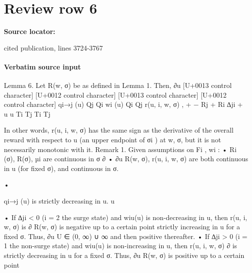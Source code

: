 \documentclass[10pt]{article}
\begin{document}
\section*{Review row 6}
\textbf{Source locator:} {\footnotesize\raggedright cited publication, lines 3724-\allowbreak{}3767\par}
\paragraph{Verbatim source input}
\begin{ReviewVerbatim}
Lemma 6. Let R(w, σ) be as defined in Lemma 1. Then, ∂u
[U+0013 control character]
[U+0012 control character]
[U+0013 control character] [U+0012 control character]
qi→j (u)
Qj
Qi
wi (u) Qi Qj
r(u, i, w, σ) ,
+
−
Rj +
Ri
∆ji +
u
u
Ti
Tj
Ti
Tj

In other words, r(u, i, w, σ) has the same sign as the derivative of the overall reward with respect
to u (an upper endpoint of σi ) at w, σ, but it is not necessarily monotonic with it.
Remark 1. Given assumptions on Fi , wi :
• Ri (σ), R(σ), µi are continuous in σ
∂
• ∂u
R(w, σ), r(u, i, w, σ) are both continuous in u (for fixed σ), and continuous in σ.

•

qi→j (u)
is strictly decreasing in u.
u

• If ∆ji < 0 (i = 2 the surge state) and wiu(u) is non-decreasing in u, then r(u, i, w, σ) is
∂
R(w, σ) is negative up to a certain point
strictly increasing in u for a fixed σ. Thus, ∂u
U ∈ (0, ∞) ∪ {∞} and then positive thereafter.
• If ∆ji > 0 (i = 1 the non-surge state) and wiu(u) is non-increasing in u, then r(u, i, w, σ)
∂
is strictly decreasing in u for a fixed σ. Thus, ∂u
R(w, σ) is positive up to a certain point
\end{ReviewVerbatim}
\end{document}
